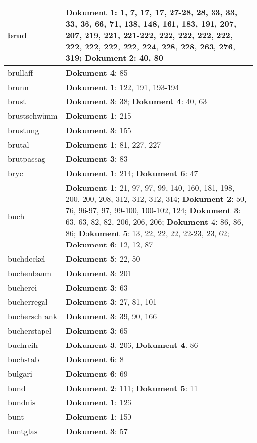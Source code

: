 \documentclass[a5paper]{article}
\begin{document}
\begin{longtable}[l]{|l|p{3in}|}
\hline
brud & \textbf{Dokument 1}: 1, 7, 17, 17, 27-28, 28, 33, 33, 33, 36, 66, 71, 138, 148, 161, 183, 191, 207, 207, 219, 221, 221-222, 222, 222, 222, 222, 222, 222, 222, 222, 224, 228, 228, 263, 276, 319; \textbf{Dokument 2}: 40, 80 \\
\hline
brullaff & \textbf{Dokument 4}: 85 \\
\hline
brunn & \textbf{Dokument 1}: 122, 191, 193-194 \\
\hline
brust & \textbf{Dokument 3}: 38; \textbf{Dokument 4}: 40, 63 \\
\hline
brustschwimm & \textbf{Dokument 1}: 215 \\
\hline
brustung & \textbf{Dokument 3}: 155 \\
\hline
brutal & \textbf{Dokument 1}: 81, 227, 227 \\
\hline
brutpassag & \textbf{Dokument 3}: 83 \\
\hline
bryc & \textbf{Dokument 1}: 214; \textbf{Dokument 6}: 47 \\
\hline
buch & \textbf{Dokument 1}: 21, 97, 97, 99, 140, 160, 181, 198, 200, 200, 208, 312, 312, 312, 314; \textbf{Dokument 2}: 50, 76, 96-97, 97, 99-100, 100-102, 124; \textbf{Dokument 3}: 63, 63, 82, 82, 206, 206, 206; \textbf{Dokument 4}: 86, 86, 86; \textbf{Dokument 5}: 13, 22, 22, 22, 22-23, 23, 62; \textbf{Dokument 6}: 12, 12, 87 \\
\hline
buchdeckel & \textbf{Dokument 5}: 22, 50 \\
\hline
buchenbaum & \textbf{Dokument 3}: 201 \\
\hline
bucherei & \textbf{Dokument 3}: 63 \\
\hline
bucherregal & \textbf{Dokument 3}: 27, 81, 101 \\
\hline
bucherschrank & \textbf{Dokument 3}: 39, 90, 166 \\
\hline
bucherstapel & \textbf{Dokument 3}: 65 \\
\hline
buchreih & \textbf{Dokument 3}: 206; \textbf{Dokument 4}: 86 \\
\hline
buchstab & \textbf{Dokument 6}: 8 \\
\hline
bulgari & \textbf{Dokument 6}: 69 \\
\hline
bund & \textbf{Dokument 2}: 111; \textbf{Dokument 5}: 11 \\
\hline
bundnis & \textbf{Dokument 1}: 126 \\
\hline
bunt & \textbf{Dokument 1}: 150 \\
\hline
buntglas & \textbf{Dokument 3}: 57 \\

\end{longtable}
\end{document}
